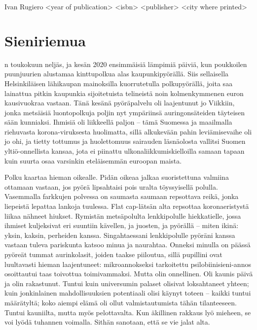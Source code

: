 \documentclass{tsnovel}
\begin{document}
        {Ivan Rugiero}
        {<year of publication>}
        {<isbn>}
        {<publisher>}
        {<city where printed>}

\chapter{Sieniriemua}

n toukokuun neljäs, ja kesän 2020 ensimmäisiä lämpimiä päiviä, kun poukkoilen puunjuurien alustamaa kinttupolkua alas kaupunkipyörällä. Siis sellaisella Helsinkiläisen lähikaupan mainoksilla kuorrutetulla polkupyörällä, joita saa lainattua pitkin kaupunkia sijoitetuista telineistä noin kolmenkymmenen euron kausivuokraa vastaan. Tänä kesänä pyöräpalvelu oli laajentunut jo Viikkiin, jonka metsäisiä luontopolkuja poljin nyt ympäriinsä auringonsäteiden täyteisen sään kunniaksi. Ihmisiä oli liikkeellä paljon – tämä Suomessa ja maailmalla riehuvasta korona-viruksesta huolimatta, sillä alkukevään pahin leviämisevaihe oli jo ohi, ja tietty tottumus ja huolettomuus  sairauden läsnäolosta vallitsi Suomen yltiö-onnellista kansaa, jota ei piinattu ulkonaliikkumiskielloilla samaan tapaan kuin suurta osaa varsinkin eteläisemmän euroopan maista.

Polku kaartaa hieman oikealle. Pidän oikeaa jalkaa suoristettuna valmiina ottamaan vastaan, jos pyörä lipsahtaisi pois uralta töyssyisellä polulla. Vasemmalla farkkujen polvessa on saumasta saumaan repsottava reikä, jonka liepeistä lepattaa lankoja tuulessa. Flat cap-lätsän alta repsottaa koronaeristystä liikaa nähneet hiukset. Rymistän metsäpolulta lenkkipolulle hiekkatielle, jossa ihmiset kuljeksivat eri suuntiin  kävellen, ja juosten, ja pyörällä – miten ikinä: yksin, kaksin, perheiden kanssa. Singahtaessani lenkkipolulle pyöräni kanssa vastaan tuleva pariskunta katsoo minua ja naurahtaa. Onneksi minulla on päässä pyöreät tummat aurinkolasit, joiden taakse piiloutua, sillä pupillini ovat luultavasti hieman laajentuneet:  mikroannokseksi tarkoitettu psilobiinisieni-annos osoittautui taas toivottua toimivammaksi. Mutta olin onnellinen. Oli kaunis päivä ja olin rakastunut. Tuntui kuin universumin palaset olisivat loksahtaneet yhteen; kuin jonkinlainen mahdollisuuksien potentiaali olisi käynyt toteen – kaikki tuntui määrätyltä; koko aiempi elämä oli ollut valmistautumista tähän tilanteeseen. Tuntui kauniilta, mutta myös pelottavalta. Kun äkillinen rakkaus lyö mieheen, se voi lyödä tuhannen voimalla.  Sithän sanotaan, että se vie jalat alta.
\end{document}
